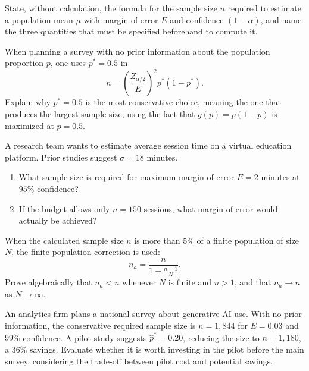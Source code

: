 \begin{problema}\label{prob:01c5fc7}
State, without calculation, the formula for the sample size $n$ required to estimate a population mean $\mu$ with margin of error $E$ and confidence $(1-\alpha)$, and name the three quantities that must be specified beforehand to compute it.
\end{problema}

\begin{problema}\label{prob:f82cc83}
When planning a survey with no prior information about the population proportion $p$, one uses $p^*=0.5$ in
\[
	n=\left(\frac{Z_{\alpha/2}}{E}\right)^2p^*(1-p^*).
\]
Explain why $p^*=0.5$ is the most conservative choice, meaning the one that produces the largest sample size, using the fact that $g(p)=p(1-p)$ is maximized at $p=0.5$.
\end{problema}

\begin{problema}\label{prob:f57d73c}
A research team wants to estimate average session time on a virtual education platform. Prior studies suggest $\sigma=18$ minutes.
\begin{enumerate}[label=(\alph*)]
	\item What sample size is required for maximum margin of error $E=2$ minutes at $95\%$ confidence?
	\item If the budget allows only $n=150$ sessions, what margin of error would actually be achieved?
\end{enumerate}
\end{problema}

\begin{problema}\label{prob:2e73754}
When the calculated sample size $n$ is more than $5\%$ of a finite population of size $N$, the finite population correction is used:
\[
	n_a=\frac{n}{1+\frac{n-1}{N}}.
\]
Prove algebraically that $n_a<n$ whenever $N$ is finite and $n>1$, and that $n_a\to n$ as $N\to\infty$.
\end{problema}

\begin{problema}\label{prob:d79f0c1}
An analytics firm plans a national survey about generative AI use. With no prior information, the conservative required sample size is $n=1{,}844$ for $E=0.03$ and $99\%$ confidence. A pilot study suggests $\hat p^*=0.20$, reducing the size to $n=1{,}180$, a $36\%$ savings. Evaluate whether it is worth investing in the pilot before the main survey, considering the trade-off between pilot cost and potential savings.
\end{problema}

